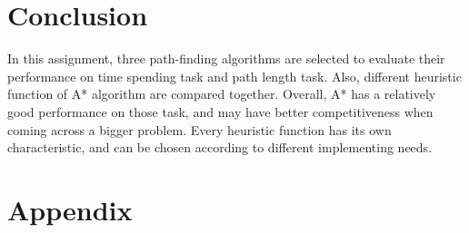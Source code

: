 \documentclass{article}
\begin{document}
	\section*{Conclusion}
	In this assignment, three path-finding algorithms are selected to evaluate their performance on time spending task and path length task. Also, different heuristic function of A* algorithm are compared together. Overall, A* has a relatively good performance on those task, and may have better competitiveness when coming across a bigger problem. Every heuristic function has its own characteristic, and can be chosen according to different implementing needs.
	
	\section*{Appendix}
\end{document}
